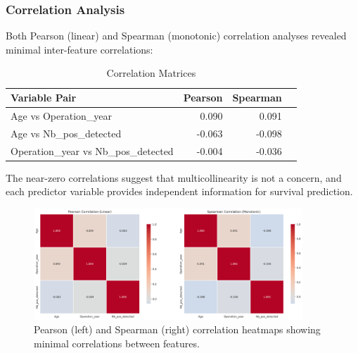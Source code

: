 \documentclass[12pt,a4paper]{article}
\begin{document}
\subsubsection{Correlation Analysis}

Both Pearson (linear) and Spearman (monotonic) correlation analyses revealed minimal inter-feature correlations:

\begin{table}[H]
\centering
\caption{Correlation Matrices}
\label{tab:correlations}
\begin{tabular}{lrrr}
\toprule
\textbf{Variable Pair} & \textbf{Pearson} & \textbf{Spearman} \\
\midrule
Age vs Operation\_year & 0.090 & 0.091 \\
Age vs Nb\_pos\_detected & -0.063 & -0.098 \\
Operation\_year vs Nb\_pos\_detected & -0.004 & -0.036 \\
\bottomrule
\end{tabular}
\end{table}

The near-zero correlations suggest that multicollinearity is not a concern, and each predictor variable provides independent information for survival prediction.

\begin{figure}[H]
\centering
\includegraphics[width=0.9\textwidth]{correlation_heatmaps.png}
\caption{Pearson (left) and Spearman (right) correlation heatmaps showing minimal correlations between features.}
\label{fig:correlation_heatmaps}
\end{figure}
\end{document}

